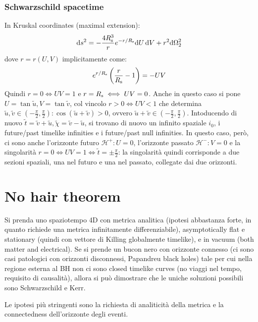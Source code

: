 \subsubsection{Schwarzschild spacetime}

In Kruskal coordinates (maximal extension):
\begin{equation*}
  \mathrm{d} s^2 = - \frac{4R_\text{s}^3}{r} e^{-r / R_\text{s}} \mathrm{d} U \, \mathrm{d} V + r^2 \mathrm{d} \Omega_2^2
\end{equation*}
dove $ r = r(U,V) $ implicitamente come:
\begin{equation*}
  e^{r / R_\text{s}} \left( \frac{r}{R_\text{s}} - 1 \right) = - U V
\end{equation*}
Quindi $ r = 0 \iff UV = 1 $ e $ r = R_\text{s} \iff UV = 0 $. Anche in questo caso si pone $ U = \tan \tilde{u} , V = \tan \tilde{v} $, col vincolo $ r > 0 \iff UV < 1 $ che determina $ \tilde{u} , \tilde{v} \in \left( - \frac{\pi}{2} , \frac{\pi}{2} \right) : \cos (\tilde{u} + \tilde{v}) > 0 $, ovvero $ \tilde{u} + \tilde{v} \in \left( - \frac{\pi}{2} , \frac{\pi}{2} \right) $. Intoducendo di nuovo $ \tilde{t} = \tilde{v} + \tilde{u} , \tilde{\chi} = \tilde{v} - \tilde{u} $, si trovano di nuovo un infinito spaziale $ i_0 $, i future/past timelike infinities e i future/past null infinities. In questo caso, però, ci sono anche l'orizzonte futuro $ \mathscr{H}^+ : U = 0 $, l'orizzonte passato $ \mathscr{H}^- : V = 0 $ e la singolarità $ r = 0 \iff UV = 1 \iff \tilde{t} = \pm \frac{\pi}{2} $: la singolarità quindi corrisponde a due sezioni spaziali, una nel futuro e una nel passato, collegate dai due orizzonti.

\section{No hair theorem}

Si prenda uno spaziotempo 4D con metrica analitica (ipotesi abbastanza forte, in quanto richiede una metrica infinitamente differenziabile), asymptotically flat e stationary (quindi con vettore di Killing globalmente timelike), e in vacuum (both matter and electrical). Se si prende un bucon nero con orizzonte connesso (ci sono casi patologici con orizzonti disconnessi, Papandreu black holes) tale per cui nella regione esterna al BH non ci sono closed timelike curves (no viaggi nel tempo, requisito di causalità), allora si può dimostrare che le uniche soluzioni possibili sono Schwarzschild e Kerr.

Le ipotesi più stringenti sono la richiesta di analiticità della metrica e la connectedness dell'orizzonte degli eventi.

